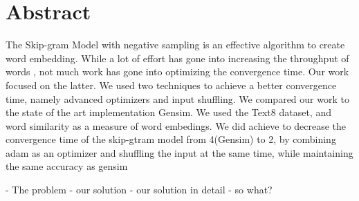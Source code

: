 \chapter*{Abstract}
The Skip-gram Model with negative sampling is an effective algorithm to create word embedding. While a lot of effort has gone into increasing the throughput of words , not much work has gone into optimizing the convergence time. Our work focused on the latter. We used two techniques to achieve a better convergence time, namely advanced optimizers and input shuffling. We compared our work to the state of the art implementation Gensim. We used the Text8 dataset, and word similarity as a measure of word embedings. We did achieve to decrease the convergence time of the skip-gtram model from 4(Gensim) to 2, by combining adam as an optimizer and shuffling the input at the same time, while maintaining the same accuracy as gensim

- The problem
- our solution
- our solution in detail
- so what? 